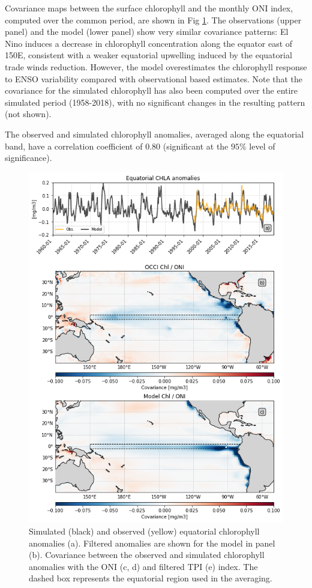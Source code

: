 Covariance maps between the surface chlorophyll and the monthly ONI index, computed over the common period, are shown in Fig \ref{fig:nemo-sat-chl}. The observations (upper panel) and the model (lower panel) show very similar covariance patterns: El Nino induces a decrease in chlorophyll concentration along the equator east of 150\degree{}E, consistent with a weaker equatorial upwelling induced by the equatorial trade winds reduction. However, the model overestimates the chlorophyll response to ENSO variability compared with observational based estimates. Note that the covariance for the simulated chlorophyll has also been computed over the entire simulated period (1958-2018), with no significant changes in the resulting pattern (not shown). 

The observed and simulated chlorophyll anomalies, averaged along the equatorial band, have a correlation coefficient of $0.80$ (significant at the $95\%$ level of significance).

\begin{figure}[htp]
	\centering
	\includegraphics[scale=0.4]{figs/fig2.png}
	\caption{Simulated (black) and observed (yellow) equatorial chlorophyll anomalies (a). Filtered anomalies are shown for the model in panel (b). Covariance between the observed and simulated chlorophyll anomalies with the ONI (c, d) and filtered TPI (e) index. The dashed box represents the equatorial region used in the averaging.}
	\label{fig:nemo-sat-chl}
\end{figure}

